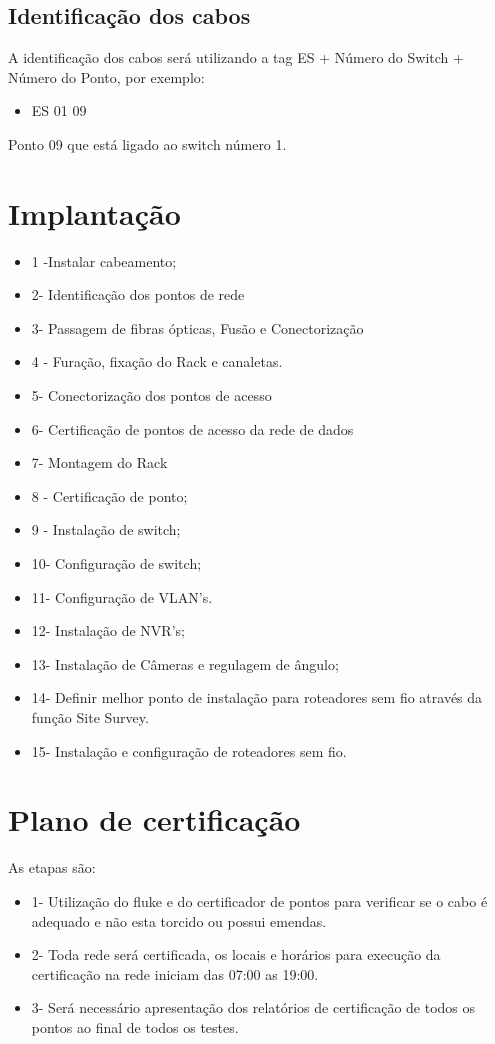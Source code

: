 \documentclass[	DIV=calc,%
							paper=a4,%
							fontsize=12pt,%
							onecolumn]{scrartcl}	 					%
\begin{document}
\subsection{Identificação dos cabos}

A identificação dos cabos será utilizando a tag ES + Número do Switch + Número do Ponto, por exemplo:
\begin{itemize}
\item ES 01 09
\end{itemize}
Ponto 09 que está ligado ao switch número 1.

\section{Implantação}
\begin{itemize}
\item 1 -Instalar cabeamento;
\item 2- Identificação dos pontos de rede
\item 3- Passagem de fibras ópticas, Fusão e Conectorização
\item 4 - Furação, fixação do Rack e canaletas.
\item 5- Conectorização dos pontos de acesso
\item 6- Certificação de pontos de acesso da rede de dados
\item 7- Montagem do Rack
\item 8 - Certificação de ponto;
\item 9 - Instalação de switch;
\item 10- Configuração de switch;
\item 11- Configuração de VLAN's.
\item 12- Instalação de NVR's;
\item 13- Instalação de Câmeras e regulagem de ângulo;
\item 14- Definir melhor ponto de instalação para roteadores sem fio através da função Site Survey.
\item 15- Instalação e configuração de roteadores sem fio.

\end{itemize}

\section{Plano de certificação}

As etapas são:
\begin{itemize}
\item 1- Utilização do fluke e do certificador de pontos para verificar se o cabo é adequado e não esta torcido ou possui emendas.  
\item 2- Toda rede será certificada, os locais e horários para execução da certificação na rede iniciam das 07:00 as 19:00.
\item 3- Será necessário apresentação dos relatórios de certificação de todos os pontos ao final de todos os testes.
\end{itemize}
\end{document}
